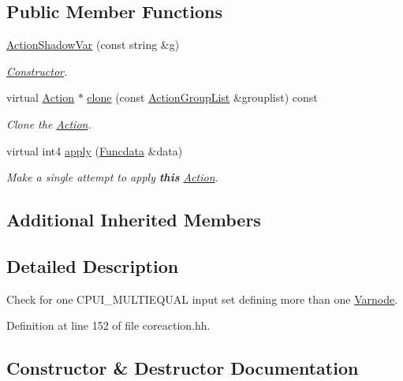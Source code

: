 \subsection*{Public Member Functions}
\begin{DoxyCompactItemize}
\item 
\mbox{\hyperlink{class_action_shadow_var_aac99665ecb0ea99ece8161a5c3a3ff40}{Action\+Shadow\+Var}} (const string \&g)
\begin{DoxyCompactList}\small\item\em \mbox{\hyperlink{class_constructor}{Constructor}}. \end{DoxyCompactList}\item 
virtual \mbox{\hyperlink{class_action}{Action}} $\ast$ \mbox{\hyperlink{class_action_shadow_var_ad60ce611f28bd7c51a34b8905cfe0155}{clone}} (const \mbox{\hyperlink{class_action_group_list}{Action\+Group\+List}} \&grouplist) const
\begin{DoxyCompactList}\small\item\em Clone the \mbox{\hyperlink{class_action}{Action}}. \end{DoxyCompactList}\item 
virtual int4 \mbox{\hyperlink{class_action_shadow_var_aac5164f51e21d4e76da14d7c2063c149}{apply}} (\mbox{\hyperlink{class_funcdata}{Funcdata}} \&data)
\begin{DoxyCompactList}\small\item\em Make a single attempt to apply {\bfseries{this}} \mbox{\hyperlink{class_action}{Action}}. \end{DoxyCompactList}\end{DoxyCompactItemize}
\subsection*{Additional Inherited Members}


\subsection{Detailed Description}
Check for one C\+P\+U\+I\+\_\+\+M\+U\+L\+T\+I\+E\+Q\+U\+AL input set defining more than one \mbox{\hyperlink{class_varnode}{Varnode}}. 

Definition at line 152 of file coreaction.\+hh.



\subsection{Constructor \& Destructor Documentation}
\mbox{\label{class_action_shadow_var_aac99665ecb0ea99ece8161a5c3a3ff40}} 
